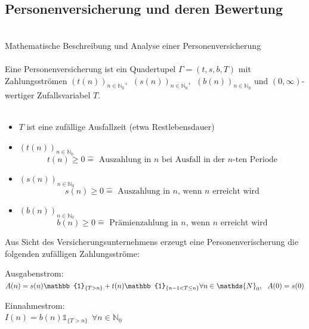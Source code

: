 \subsection{Personenversicherung und deren Bewertung}
\label{sub:personenversicherung}
\\
Mathematische Beschreibung und Analyse einer Personenversicherung\\
\\
Eine Personenversicherung ist ein Quadertupel $\Gamma=(t,s,b,T)$ mit Zahlungsströmen $(t(n))_{n \in \mathds{N}_0},~~(s(n))_{n\in \mathds{N}_0},~~(b(n))_{n \in \mathds{N}_0}$ und $(0,\infty)$-wertiger Zufallsvariabel $T$.\\
\\
\begin{itemize}
	\item $T$ ist eine zufällige Ausfallzeit (etwa Restlebensdauer)
	\item {} $(t(n))_{n\in \mathds{N}_0}$
	\[
	t(n)\ge 0 \mathrel{\hat=} \text{ Auszahlung in $n$ bei Ausfall in der $n$-ten Periode} 
	\]
	\item {} $(s(n))_{n\in \mathds{N}_0}$
	\[
	s(n)\ge 0 \mathrel{\hat{=}} \text{ Auszahlung in $n$, wenn $n$ erreicht wird} 
	\]
	\item {} $(b(n))_{n \in \mathds{N}_0}$
	\[
	b(n)\ge 0 \mathrel{\hat{=}} \text{ Prämienzahlung in $n$, wenn $n$ erreicht wird} 
	\]
\end{itemize}
Aus Sicht des Versicherungsunternehmens erzeugt eine Personenverischerung die folgenden zufälligen Zahlungsströme:\\

\begin{minipage}[t]{8.7cm}
	Ausgabenstrom:\\
	$A(n)=s(n) \mathbb{1}_{\{T>n \}} + t(n) \mathbb{1}_{\{n-1<T\le n \}} \\ \forall n \in \mathds{N}_0,~~A(0)=s(0)$
\end{minipage}
\begin{minipage}[t]{5cm}
	Einnahmestrom:\\
	$I(n)=b(n)\mathbb{1}_{\{T>n \}}~~\forall n \in \mathds{N}_0$
\end{minipage}

